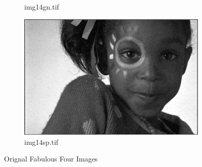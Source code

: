 \documentclass{article}
\begin{document}
\begin{figure}[h]
\begin{subfigure}{0.5\textwidth}
			\caption{img14gn.tif}
		\end{subfigure}
		\begin{subfigure}{0.5\textwidth}
			\includegraphics[width=1.0\textwidth]{img14sp.png}
			\caption{img14sp.tif}
		\end{subfigure}
		\caption{Orignal Fabulous Four Images}
	\end{figure}
\end{document}
